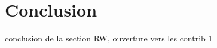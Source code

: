 



\section*{Conclusion}
\begin{todo}
conclusion de la section RW, ouverture vers les contrib 1
\end{todo}
